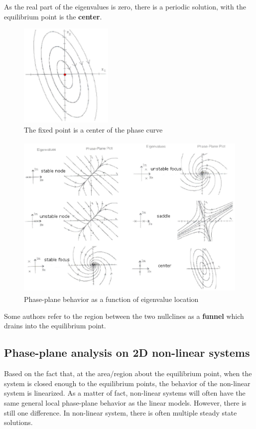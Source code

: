 As the real part of the eigenvalues is zero, there is a periodic
solution, with the equilibrium point is the {\bf center}.
\begin{figure}[htb]
  \centerline{\includegraphics[height=5cm]{./images/center_fixed_point.eps}}
  \caption{The fixed point is a center of the phase curve}\label{fig:center_fixed_point}
\end{figure}


\begin{figure}[htb]
  \centerline{\includegraphics[height=8cm]{./images/phase-plane_eigenvalues.eps}}
  \caption{Phase-plane behavior as a function of eigenvalue location}\label{fig:phase-plane_behavior}
\end{figure}

Some authors refer to the region between the two nullclines as a {\bf
  funnel} which drains into the equilibrium point.

\subsection{Phase-plane analysis on 2D non-linear systems}
\label{sec:phase-plane-analysis-2}

Based on the fact that, at the area/region about the equilibrium
point, when the system is closed enough to the equilibrium points, the
behavior of the non-linear system is linearized. As a matter of fact,
non-linear systems will often have the same general local phase-plane
behavior as the linear models. However, there is still one
difference. In non-linear system, there is often multiple steady state
solutions.

